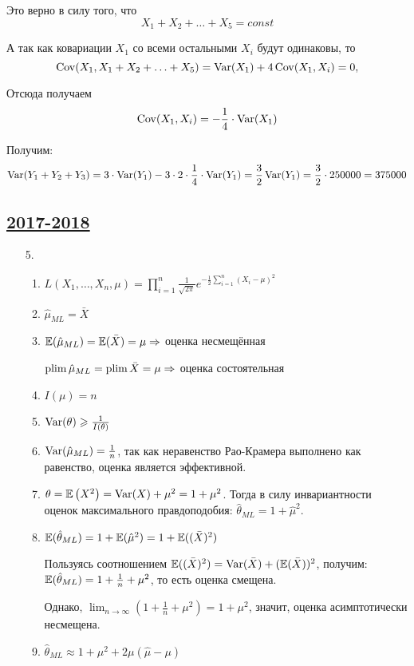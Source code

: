 \begin{enumerate}[resume]
  Это верно в силу того, что \[X_1 + X_2 + \ldots + X_5 = const \]

 А так как ковариации $X_1$ со всеми остальными $X_i$ будут одинаковы, то 
\[  \operatorname{Cov} (X_1, X_1 + X_2 + \ldots + X_5) = \operatorname{Var} (X_1) + 4 \operatorname{Cov} (X_1, X_i) = 0, \] 

 Отсюда получаем 
\[ \operatorname{Cov} (X_1, X_i) = - \frac{1}{4} \cdot \operatorname{Var} (X_1) \]
 
Получим: 
\[
 \operatorname{Var} (Y_1 + Y_2 + Y_3) = 3 \cdot \operatorname{Var} (Y_1) - 3 \cdot 2 \cdot \frac{1}{4} \cdot \operatorname{Var} (Y_1) 
  = \frac{3}{2}  \operatorname{Var} (Y_1) = \frac{3}{2} \cdot 250000 = 375000 
 \]

\subsection[2017-2018]{\hyperref[sec:kr_03_2017_2018]{2017-2018}}
\label{sec:sol_kr_03_2017_2018}


\begin{enumerate}
\item[5.]
\begin{enumerate}
\item $L(X_1, \ldots, X_n, \mu) = \prod_{i=1}^n \frac{1}{\sqrt{2\pi}} e^{-\frac{1}{2}\sum_{i=1}^n (X_i - \mu)^2}$
\item $\hat\mu_{ML} = \bar X$
\item $\operatorname{\mathbb{E}}(\hat\mu_{ML}) = \operatorname{\mathbb{E}}(\bar X) = \mu \Rightarrow$ оценка несмещённая

$\operatorname*{plim} \hat \mu_{ML} = \operatorname*{plim} \bar X = \mu \Rightarrow$ оценка состоятельная
\item $I(\mu) = n$
\item $\operatorname{Var}(\theta) \geqslant \frac{1}{I(\theta)}$
\item $\operatorname{Var}(\hat \mu_{ML}) = \frac{1}{n}$, так как неравенство Рао-Крамера выполнено
как равенство, оценка является эффективной.
\item $\theta = \operatorname{\mathbb{E}}\left(X^2\right) = \operatorname{Var}(X) + \mu^2 = 1 + \mu^2$.
Тогда в силу инвариантности оценок максимального правдоподобия: $\hat\theta_{ML} = 1 + \hat\mu^2$.
\item $\operatorname{\mathbb{E}}(\hat \theta_{ML}) = 1 + \operatorname{\mathbb{E}}(\hat \mu^2) = 1 + \operatorname{\mathbb{E}}((\bar X)^2)$

Пользуясь соотношением $\operatorname{\mathbb{E}}((\bar X)^2) = \operatorname{Var}(\bar X) + (\operatorname{\mathbb{E}}(\bar X))^2$,
получим: $\operatorname{\mathbb{E}}(\hat \theta_{ML}) = 1 + \frac{1}{n} + \mu^2$, то есть оценка смещена.

Однако, $\lim_{n \to \infty} \left(1 + \frac{1}{n} + \mu^2\right) = 1 + \mu^2$, значит,
оценка асимптотически несмещена.
\item $\hat \theta_{ML} \approx 1 + \mu^2 + 2\mu(\hat \mu - \mu)$


\end{enumerate}
\end{enumerate}
\end{enumerate}
